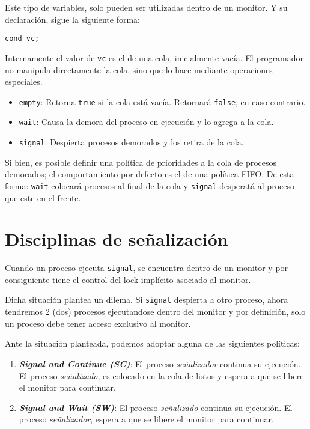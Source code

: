\documentclass[a4paper, 10pt]{report}
\begin{document}
Este tipo de variables, solo pueden ser utilizadas dentro de un monitor. Y su declaración, sigue la siguiente forma:

\begin{lstlisting}
cond vc;
\end{lstlisting}

Internamente el valor de \lstinline{vc} es el de una cola, inicialmente vacía. El programador no manipula directamente la cola, sino que lo hace mediante operaciones especiales.

\begin{itemize}
	\item \lstinline{empty}: Retorna \lstinline{true} si la cola está vacía. Retornará \lstinline{false}, en caso contrario.
	\item \lstinline{wait}: Causa la demora del proceso en ejecución y lo agrega a la cola.
	\item \lstinline{signal}: Despierta procesos demorados y los retira de la cola.
\end{itemize}

Si bien, es posible definir una política de prioridades a la cola de procesos demorados; el comportamiento por defecto es el de una política FIFO. De esta forma: \lstinline{wait} colocará procesos al final de la cola y \lstinline{signal} desperatá al proceso que este en el frente.

\section{Disciplinas de señalización}

Cuando un proceso ejecuta \lstinline{signal}, se encuentra dentro de un monitor y por consiguiente tiene el control del lock implícito asociado al monitor. 

Dicha situación plantea un dilema. Si \lstinline{signal} despierta a otro proceso, ahora tendremos 2 (dos) procesos ejecutandose dentro del monitor y por definición, solo un proceso debe tener acceso exclusivo al monitor.

Ante la situación planteada, podemos adoptar alguna de las siguientes políticas:

\begin{enumerate}
	\item \textbf{\emph{Signal and Continue (SC)}}: El proceso \emph{señalizador} continua su ejecución. El proceso \emph{señalizado}, es colocado en la cola de listos y espera a que se libere el monitor para continuar.
	\item \textbf{\emph{Signal and Wait (SW)}}: El proceso \emph{señalizado} continua su ejecución. El proceso \emph{señalizador}, espera a que se libere el monitor para continuar.
\end{enumerate}
\end{document}
